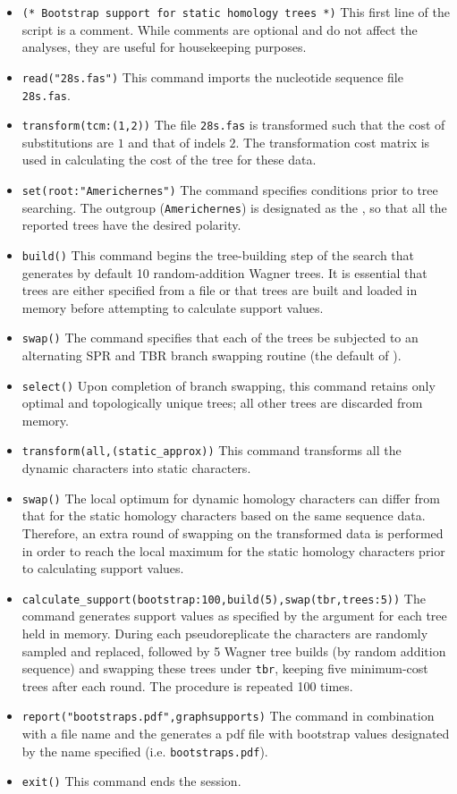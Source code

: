 \begin{itemize}
\item \texttt{(* Bootstrap support for static homology trees *)} This first line of the script is a comment. While
 comments are optional and do not affect the analyses, they are useful for housekeeping purposes.
\item \texttt{read("28s.fas")} This command imports the nucleotide sequence file \texttt{28s.fas}.
\item \texttt{transform(tcm:(1,2))} The file \texttt{28s.fas} is transformed such that the cost of substitutions 
are $1$ and that of indels $2$.  The transformation cost matrix is used in calculating the cost of the tree
for these data.
\item \texttt{set(root:"Americhernes")} The  command specifies conditions prior to tree 
searching. The outgroup (\texttt{Americhernes}) is designated as the , so that all the reported 
trees have the desired polarity.     
\item \texttt{build()} This command begins the tree-building step of the search that generates by default 10 
random-addition Wagner trees. It is essential that trees are either specified from a file or that trees are built and loaded in 
memory before attempting to calculate support values.
\item \texttt{swap()} The  command specifies that each of the trees be subjected to an 
alternating SPR and TBR branch swapping routine (the default of \poy).
\item \texttt{select()} Upon completion of branch swapping, this command retains only optimal and topologically 
unique trees; all other trees are discarded from memory. 
\item \texttt{transform(all,(static\_approx))} This command transforms all the dynamic characters into static characters.
\item \texttt{swap()} The local optimum for dynamic homology characters can differ from that for the static 
homology characters based on the same sequence data. Therefore, an extra round of swapping on the transformed 
data is performed in order to reach the local maximum for the static homology characters prior to calculating support values.
\item \texttt{calculate\_support(bootstrap:100,build(5),swap(tbr,trees:5))} The  
command generates support values as specified by the  argument for each tree held in 
memory. During each pseudoreplicate the characters are randomly sampled and replaced, followed by 5 Wagner 
tree builds (by random addition sequence) and swapping these trees under \texttt{tbr}, keeping five minimum-cost trees
after each round. The procedure is repeated 100 times.
\item \texttt{report("bootstraps.pdf",graphsupports)}  The  command in combination with 
a file name and the  generates a pdf file with bootstrap values designated by the 
name specified (i.e. \texttt{bootstraps.pdf}). 
\item \texttt{exit()} This command ends the \poy session.
\end{itemize}

